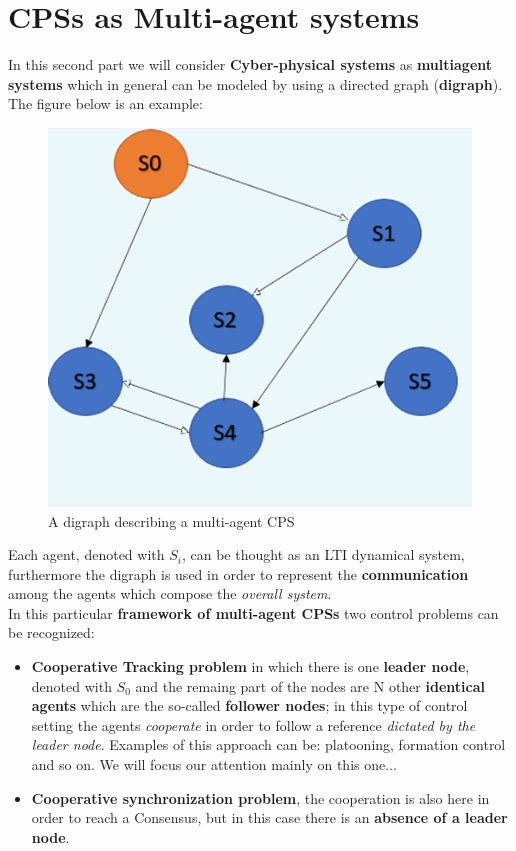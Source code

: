 \section{CPSs as Multi-agent systems}
In this second part we will consider \textbf{Cyber-physical systems} as \textbf{multiagent systems} which in general can be modeled by using a directed graph (\textbf{digraph}). The figure below is an example:

\begin{figure}[h]
    \centering
    \includegraphics[scale=0.6]{images/MultiAgent.png}
    \caption{A digraph describing a multi-agent CPS}
\end{figure}

Each agent, denoted with $S_i$, can be thought as an LTI dynamical system, furthermore the digraph is used in order to represent  the \textbf{communication} among the agents which compose the \textit{overall system}.\\
In this particular \textbf{framework of multi-agent CPSs} two control problems can be recognized:
\begin{itemize}
    \itemsep0em
    \item {\color{blue}\textbf{Cooperative Tracking problem}} in which there is one \textbf{leader node}, denoted with $S_0$ and the remaing part of the nodes are N other \textbf{identical agents} which are the so-called \textbf{follower nodes}; in this type of control setting the agents \textit{cooperate} in order to follow a reference \textit{dictated by the leader node}. Examples of this approach can be: platooning, formation control and so on. {\color{red}We will focus our attention mainly on this one...} 
    \item {\color{blue}\textbf{Cooperative synchronization problem}}, the cooperation is also here in order to reach a Consensus, but in this case there is an \textbf{absence of a leader node}.
\end{itemize} 

